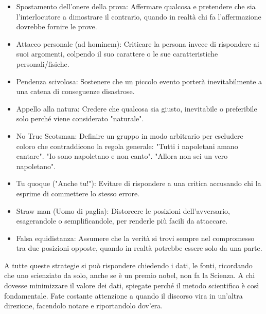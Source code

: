 \documentclass[12pt]{book} %
\begin{document}
\begin{itemize}
\item Spostamento dell’onere della prova: Affermare qualcosa e pretendere che sia l'interlocutore a dimostrare il contrario, quando in realtà chi fa l'affermazione dovrebbe fornire le prove.
\item Attacco personale (ad hominem): Criticare la persona invece di rispondere ai suoi argomenti, colpendo il suo carattere o le sue caratteristiche personali/fisiche.
\item Pendenza scivolosa: Sostenere che un piccolo evento porterà inevitabilmente a una catena di conseguenze disastrose.
\item Appello alla natura: Credere che qualcosa sia giusto, inevitabile o preferibile solo perché viene considerato "naturale".
\item No True Scotsman: Definire un gruppo in modo arbitrario per escludere coloro che contraddicono la regola generale: "Tutti i napoletani amano cantare". "Io sono napoletano e non canto". "Allora non sei un vero napoletano".
\item Tu quoque ("Anche tu!"): Evitare di rispondere a una critica accusando chi la esprime di commettere lo stesso errore.
\item Straw man (Uomo di paglia): Distorcere le posizioni dell’avversario, esagerandole o semplificandole, per renderle più facili da attaccare.
\item Falsa equidistanza: Assumere che la verità si trovi sempre nel compromesso tra due posizioni opposte, quando in realtà potrebbe essere solo da una parte.
\end{itemize}

A tutte queste strategie si può rispondere chiedendo i dati, le fonti, ricordando che uno scienziato da solo, anche se è un premio nobel, non fa la Scienza. A chi dovesse minimizzare il valore dei dati, spiegate perché il metodo scientifico è così fondamentale. Fate costante attenzione a quando il discorso vira in un'altra direzione, facendolo notare e riportandolo dov'era.

\bigskip
\end{document}
